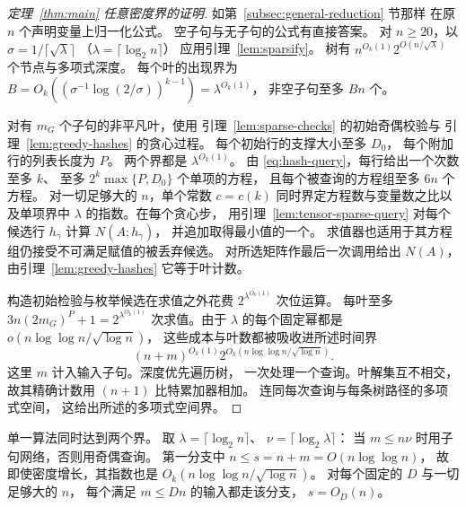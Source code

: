 \begin{proof}[定理~\ref{thm:main} 任意密度界的证明]
如第~\ref{subsec:general-reduction} 节那样
在原 $n$ 个声明变量上归一化公式。
空子句与无子句的公式有直接答案。
对 $n\ge20$，以
$\sigma=1/\lceil\sqrt{\lambda}\rceil$
（$\lambda=\lceil\log_2 n\rceil$）
应用引理~\ref{lem:sparsify}。
树有 $n^{O_k(1)}2^{O(n/\sqrt{\lambda})}$
个节点与多项式深度。
每个叶的出现界为
$B=O_k((\sigma^{-1}\log(2/\sigma))^{k-1})=\lambda^{O_k(1)}$，
非空子句至多 $Bn$ 个。

对有 $m_G$ 个子句的非平凡叶，使用
引理~\ref{lem:sparse-checks} 的初始奇偶校验与
引理~\ref{lem:greedy-hashes} 的贪心过程。
每个初始行的支撑大小至多 $D_0$，
每个附加行的列表长度为 $P$。
两个界都是 $\lambda^{O_k(1)}$。
由 \eqref{eq:hash-query}，每行给出一个次数至多 $k$、
至多 $2^k\max\{P,D_0\}$ 个单项的方程，
且每个被查询的方程组至多 $6n$ 个方程。
对一切足够大的 $n$，单个常数 $c=c(k)$
同时界定方程数与变量数之比以及单项界中 $\lambda$
的指数。在每个贪心步，
用引理~\ref{lem:tensor-sparse-query}
对每个候选行 $h_\gamma$ 计算 $N(A;h_\gamma)$，
并追加取得最小值的一个。
求值器也适用于其方程组仍接受不可满足赋值的被丢弃候选。
对所选矩阵作最后一次调用给出 $N(A)$，
由引理~\ref{lem:greedy-hashes} 它等于叶计数。

构造初始检验与枚举候选在求值之外花费
$2^{\lambda^{O_k(1)}}$ 次位运算。
每叶至多 $3n(2m_G)^P+1=2^{\lambda^{O_k(1)}}$
次求值。由于 $\lambda$ 的每个固定幂都是
$o(n\log\log n/\sqrt{\log n})$，
这些成本与叶数都被吸收进所述时间界
\[
 (n+m)^{O_k(1)}2^{O_k(n\log\log n/\sqrt{\log n})}.
\]
这里 $m$ 计入输入子句。深度优先遍历树，
一次处理一个查询。叶解集互不相交，
故其精确计数用 $(n+1)$ 比特累加器相加。
连同每次查询与每条树路径的多项式空间，
这给出所述的多项式空间界。
\end{proof}

单一算法同时达到两个界。
取 $\lambda=\lceil\log_2 n\rceil$、
$\nu=\lceil\log_2\lambda\rceil$：
当 $m\le n\nu$ 时用子句网络，否则用奇偶查询。
第一分支中 $n\le s=n+m=O(n\log\log n)$，
故即使密度增长，其指数也是
$O_k(n\log\log n/\sqrt{\log n})$。
对每个固定的 $D$ 与一切足够大的 $n$，
每个满足 $m\le Dn$ 的输入都走该分支，
$s=O_D(n)$。

